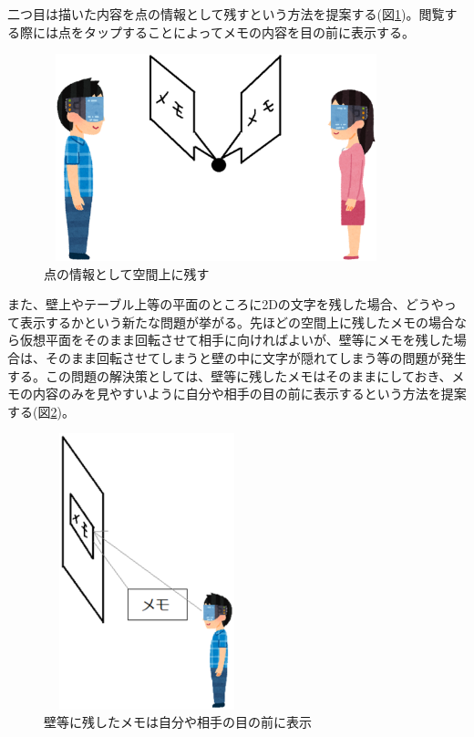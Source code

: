 \documentclass[11pt,a4j, titlepage]{jarticle} %
\begin{document}
二つ目は描いた内容を点の情報として残すという方法を提案する(図\ref{fig:memo_ten})。閲覧する際には点をタップすることによってメモの内容を目の前に表示する。

\begin{figure}[H]
  \begin{center}
    \includegraphics[clip,height=6.0cm,width=10.0cm]{./memo_ten.eps}
    \caption{点の情報として空間上に残す}
    \label{fig:memo_ten}
  \end{center}
\end{figure}

また、壁上やテーブル上等の平面のところに2Dの文字を残した場合、どうやって表示するかという新たな問題が挙がる。先ほどの空間上に残したメモの場合なら仮想平面をそのまま回転させて相手に向ければよいが、壁等にメモを残した場合は、そのまま回転させてしまうと壁の中に文字が隠れてしまう等の問題が発生する。この問題の解決策としては、壁等に残したメモはそのままにしておき、メモの内容のみを見やすいように自分や相手の目の前に表示するという方法を提案する(図\ref{fig:memo_wall})。

\begin{figure}[H]
  \begin{center}
    \includegraphics[clip,height=8.0cm,width=6.0cm]{./memo_wall.eps}
    \caption{壁等に残したメモは自分や相手の目の前に表示}
    \label{fig:memo_wall}
  \end{center}
\end{figure}
\end{document}
